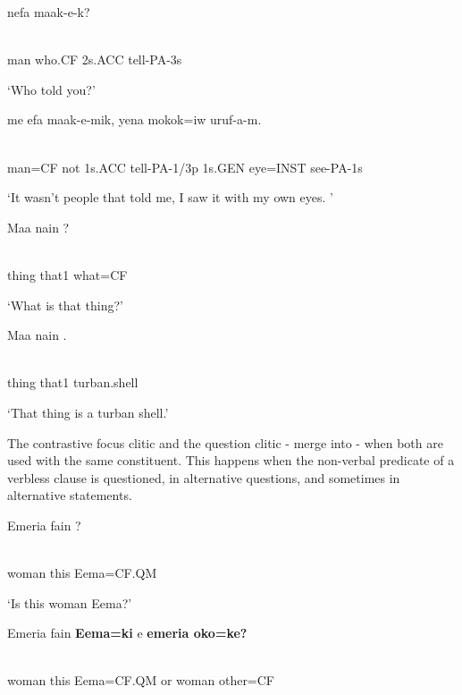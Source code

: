 \ea%
\label{ex:x1714}
\gll {}  nefa  maak-e-k? \\
      \\
\glt
\z

man  who.CF  2s.ACC  tell-PA-3s

`Who told you?'

\ea%
\label{ex:x1715}
\gll {}  me  efa  maak-e-mik,  yena  mokok=iw  uruf-a-m. \\
      \\
\glt
\z

man=CF  not  1s.ACC  tell-PA-1/3p  1s.GEN  eye=INST  see-PA-1s

`It wasn't people that told me, I saw it with my own eyes. '

\ea%
\label{ex:x1712}
\gll Maa  nain  ? \\
      \\
\glt
\z

thing  that1  what=CF

`What is that thing?'

\ea%
\label{ex:x1713}
\gll Maa  nain  . \\
      \\
\glt
\z

thing  that1  turban.shell

`That thing is a turban shell.'

The contrastive focus clitic and the question clitic - merge into - when both are used with the same constituent. This happens when the non-verbal predicate of a verbless clause is questioned, in alternative questions, and sometimes in alternative statements.

\ea%
\label{ex:x1716}
\gll Emeria  fain  ? \\
      \\
\glt
\z

woman  this  Eema=CF.QM

`Is this woman Eema?'

\ea%
\label{ex:x1718}
\gll Emeria  fain  \textbf{Eema=ki } e  \textbf{emeria  oko=ke?} \\
      \\
\glt
\z

woman  this  Eema=CF.QM  or  woman  other=CF


